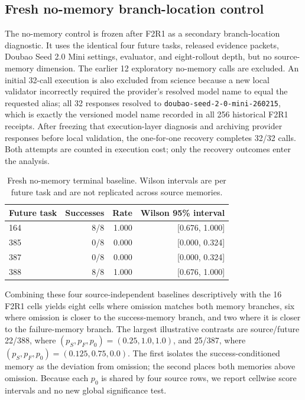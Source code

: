 \subsection{Fresh no-memory branch-location control}
The no-memory control is frozen after F2R1 as a secondary branch-location diagnostic. It uses the identical four future tasks, released evidence packets, Doubao Seed 2.0 Mini settings, evaluator, and eight-rollout depth, but no source-memory dimension. The earlier 12 exploratory no-memory calls are excluded. An initial 32-call execution is also excluded from science because a new local validator incorrectly required the provider's resolved model name to equal the requested alias; all 32 responses resolved to \texttt{doubao-seed-2-0-mini-260215}, which is exactly the versioned model name recorded in all 256 historical F2R1 receipts. After freezing that execution-layer diagnosis and archiving provider responses before local validation, the one-for-one recovery completes 32/32 calls. Both attempts are counted in execution cost; only the recovery outcomes enter the analysis.

\begin{table}[h]
\centering
\small
\caption{Fresh no-memory terminal baseline. Wilson intervals are per future task and are not replicated across source memories.}
\label{tab:o5-no-memory}
\begin{tabular}{lrrr}
\toprule
Future task & Successes & Rate & Wilson 95\% interval \\
\midrule
164 & 8/8 & 1.000 & [0.676, 1.000] \\
385 & 0/8 & 0.000 & [0.000, 0.324] \\
387 & 0/8 & 0.000 & [0.000, 0.324] \\
388 & 8/8 & 1.000 & [0.676, 1.000] \\
\bottomrule
\end{tabular}
\end{table}

Combining these four source-independent baselines descriptively with the 16 F2R1 cells yields eight cells where omission matches both memory branches, six where omission is closer to the success-memory branch, and two where it is closer to the failure-memory branch. The largest illustrative contrasts are source/future 22/388, where $(p_S,p_F,p_0)=(0.25,1.0,1.0)$, and 25/387, where $(p_S,p_F,p_0)=(0.125,0.75,0.0)$. The first isolates the success-conditioned memory as the deviation from omission; the second places both memories above omission. Because each $p_0$ is shared by four source rows, we report cellwise score intervals and no new global significance test.

